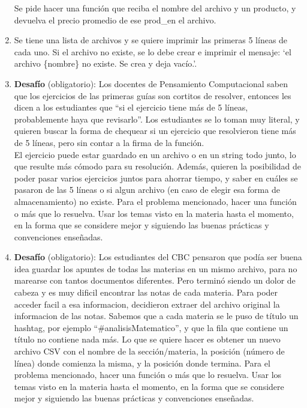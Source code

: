 \documentclass[
  letterpaper,
  DIV=11,
  numbers=noendperiod]{scrreprt}
\begin{document}
\begin{enumerate}
  Se pide hacer una función que reciba el nombre del archivo y un
  producto, y devuelva el precio promedio de ese prod\_en el archivo.
\item
  Se tiene una lista de archivos y se quiere imprimir las primeras 5
  líneas de cada uno. Si el archivo no existe, se lo debe crear e
  imprimir el mensaje: `el archivo \{nombre\} no existe. Se crea y deja
  vacío.'.
\item
  \textbf{Desafío} (obligatorio): Los docentes de Pensamiento
  Computacional saben que los ejercicios de las primeras guías son
  cortitos de resolver, entonces les dicen a los estudiantes que ``si el
  ejercicio tiene más de 5 líneas, probablemente haya que revisarlo''.
  Los estudiantes se lo toman muy literal, y quieren buscar la forma de
  chequear si un ejercicio que resolvieron tiene más de 5 líneas, pero
  sin contar a la firma de la función.\\
  El ejercicio puede estar guardado en un archivo o en un string todo
  junto, lo que resulte más cómodo para su resolución. Además, quieren
  la posibilidad de poder pasar varios ejercicios juntos para ahorrar
  tiempo, y saber en cuáles se pasaron de las 5 líneas o si algun
  archivo (en caso de elegir esa forma de almacenamiento) no existe.
  Para el problema mencionado, hacer una función o más que lo resuelva.
  Usar los temas visto en la materia hasta el momento, en la forma que
  se considere mejor y siguiendo las buenas prácticas y convenciones
  enseñadas.
\item
  \textbf{Desafío} (obligatorio): Los estudiantes del CBC pensaron que
  podía ser buena idea guardar los apuntes de todas las materias en un
  mismo archivo, para no marearse con tantos documentos diferentes. Pero
  terminó siendo un dolor de cabeza y es muy dificil encontrar las notas
  de cada materia. Para poder acceder facil a esa informacion,
  decidieron extraer del archivo original la informacion de las notas.
  Sabemos que a cada materia se le puso de título un hashtag, por
  ejemplo ``\#analisisMatematico'', y que la fila que contiene un título
  no contiene nada más. Lo que se quiere hacer es obtener un nuevo
  archivo CSV con el nombre de la sección/materia, la posición (número
  de línea) donde comienza la misma, y la posición donde termina. Para
  el problema mencionado, hacer una función o más que lo resuelva. Usar
  los temas visto en la materia hasta el momento, en la forma que se
  considere mejor y siguiendo las buenas prácticas y convenciones
  enseñadas.
\end{enumerate}
\end{document}

